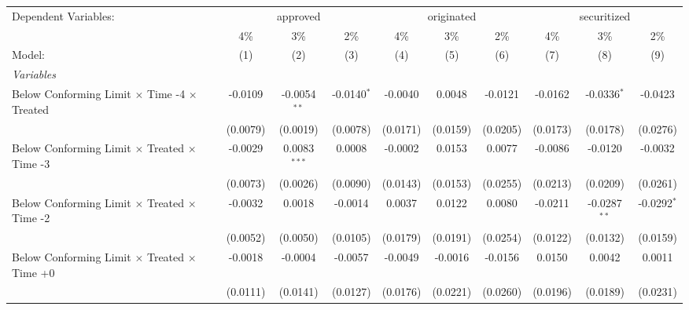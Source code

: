 \begingroup
\centering
\begin{tabular}{lccccccccc}
   \tabularnewline \midrule \midrule
   Dependent Variables: & \multicolumn{3}{c}{approved} & \multicolumn{3}{c}{originated} & \multicolumn{3}{c}{securitized}\\
                                                              & 4\%           & 3\%            & 2\%            & 4\%          & 3\%          & 2\%          & 4\%           & 3\%            & 2\% \\    
   Model:                                                     & (1)           & (2)            & (3)            & (4)          & (5)          & (6)          & (7)           & (8)            & (9)\\  
   \midrule
   \emph{Variables}\\
   Below Conforming Limit $\times$ Time -4 $\times$ Treated   & -0.0109       & -0.0054$^{**}$ & -0.0140$^{*}$  & -0.0040      & 0.0048       & -0.0121      & -0.0162       & -0.0336$^{*}$  & -0.0423\\   
                                                              & (0.0079)      & (0.0019)       & (0.0078)       & (0.0171)     & (0.0159)     & (0.0205)     & (0.0173)      & (0.0178)       & (0.0276)\\   
   Below Conforming Limit $\times$ Treated $\times$ Time -3   & -0.0029       & 0.0083$^{***}$ & 0.0008         & -0.0002      & 0.0153       & 0.0077       & -0.0086       & -0.0120        & -0.0032\\   
                                                              & (0.0073)      & (0.0026)       & (0.0090)       & (0.0143)     & (0.0153)     & (0.0255)     & (0.0213)      & (0.0209)       & (0.0261)\\   
   Below Conforming Limit $\times$ Treated $\times$ Time -2   & -0.0032       & 0.0018         & -0.0014        & 0.0037       & 0.0122       & 0.0080       & -0.0211       & -0.0287$^{**}$ & -0.0292$^{*}$\\   
                                                              & (0.0052)      & (0.0050)       & (0.0105)       & (0.0179)     & (0.0191)     & (0.0254)     & (0.0122)      & (0.0132)       & (0.0159)\\   
   Below Conforming Limit $\times$ Treated $\times$ Time +0   & -0.0018       & -0.0004        & -0.0057        & -0.0049      & -0.0016      & -0.0156      & 0.0150        & 0.0042         & 0.0011\\   
                                                              & (0.0111)      & (0.0141)       & (0.0127)       & (0.0176)     & (0.0221)     & (0.0260)     & (0.0196)      & (0.0189)       & (0.0231)\\   

\end{tabular}
